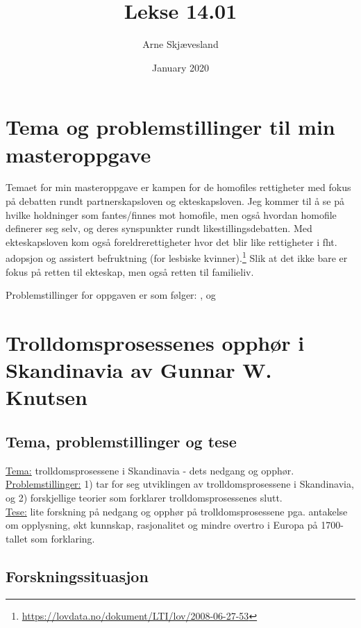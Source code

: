 \documentclass[12pt]{article}
\title{Lekse 14.01}
\author{Arne Skjævesland}
\date{January 2020}
\begin{document}
\maketitle

\section{Tema og problemstillinger til min masteroppgave}
Temaet for min masteroppgave er kampen for de homofiles rettigheter med fokus på debatten rundt partnerskapsloven og ekteskapsloven. Jeg kommer til å se på hvilke holdninger som fantes/finnes mot homofile, men også hvordan homofile definerer seg selv, og deres synspunkter rundt likestillingsdebatten. Med ekteskapsloven kom også foreldrerettigheter hvor det blir like rettigheter i fht. adopsjon og assistert befruktning (for lesbiske  kvinner).\footnote{\url{https://lovdata.no/dokument/LTI/lov/2008-06-27-53}} Slik at det ikke bare er fokus på retten til ekteskap, men også retten til familieliv.

Problemstillinger for oppgaven er som følger: , og 

\section{Trolldomsprosessenes opphør i Skandinavia av Gunnar W. Knutsen}

\subsection{Tema, problemstillinger og tese}
\underline{Tema:} trolldomsprosessene i Skandinavia - dets nedgang og opphør. \\
\underline{Problemstillinger:} 1) tar for seg utviklingen av trolldomsprosessene i Skandinavia, og 2) forskjellige teorier som forklarer trolldomsprosessenes slutt. \\
\underline{Tese:} lite forskning på nedgang og opphør på trolldomsprosessene pga. antakelse om opplysning, økt kunnskap, rasjonalitet og mindre overtro i Europa på 1700-tallet som forklaring.

\subsection{Forskningssituasjon}
\end{document}
